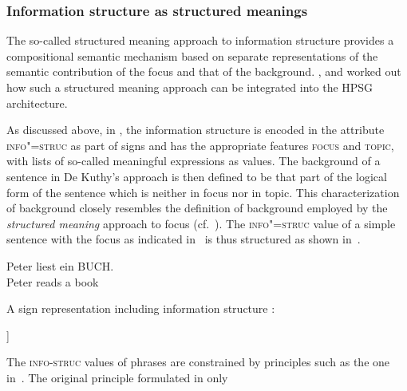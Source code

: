 \documentclass[output=paper
                ,modfonts
                ,nonflat
	        ,collection
	        ,collectionchapter
	        ,collectiontoclongg
 	        ,biblatex
                ,babelshorthands
                ,newtxmath
                ,draftmode
                ,colorlinks, citecolor=brown
]{./langsci/langscibook}
\begin{document}
\subsubsection{Information structure as structured meanings \citep{deKuthy2002a}}
\label{sec:struc-meaning}
The so-called structured meaning approach to information structure
\citep{Stechow81a-u,Jacobs83a,Krifka92a-u-kopiert} provides a
compositional semantic mechanism based on separate representations of
the semantic contribution of the focus and that of the
background. \citet{deKuthy2002a}, \cite{dKM2003a} and
\cite{Webelhuth2007a-u} worked out how such a structured meaning
approach can be integrated into the HPSG architecture.

As discussed above, in \cite{deKuthy2002a}, the information structure
is encoded in the attribute \textsc{info"=struc} as part of signs and
has the appropriate features \textsc{focus} and \textsc{topic}, with
lists of so-called meaningful expressions as values. The background of
a sentence in De Kuthy's approach is then defined to be that part of
the logical form of the sentence which is neither in focus nor in
topic.  This characterization of background closely resembles the
definition of background employed by the \textit{structured meaning}
approach to focus (cf.\ \citealt{Krifka92a-u-kopiert}).  The
\textsc{info"=struc} value of a simple sentence with the focus as
indicated in~ is thus structured as shown
in~.
\begin{exe}
  \ex\label{ex:peter} \gll Peter {\LF}liest ein BUCH{\RF}.\\
           Peter {}reads a book\\
\end{exe}
\ea
 A sign representation including information structure \citep[163]{deKuthy2002a}:
\begin{center}
    \begin{avm}
      [s|loc|cont|lf  $\exists x \[book'\(x\) \wedge read'\(p,x\)\]$\\
       info-struc  [focus & \XlstI{$\lambda y \exists x\[book'\(x\) \wedge read'\(y,x\)\]$}\\
                     topic & \elst]
      ]
    \end{avm}

    \label{fig:focus-backgr}
  \end{center}\unskip
\z
The \textsc{info-struc} values of phrases are constrained by
principles such as the one in~. The
original principle formulated in \cite[169]{deKuthy2002a} only
\end{document}
